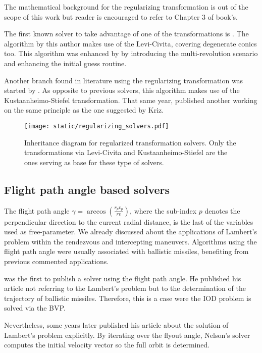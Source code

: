 The mathematical background for the regularizing transformation is out of the
scope of this work but reader is encouraged to refer to Chapter 3 of
\cite{celletti2002} book's.

The first known solver to take advantage of one of the transformations is
\cite{simo1973}. The algorithm by this author makes use of the Levi-Civita,
covering degenerate conics too. This algorithm was enhanced by \cite{torre2018}
by introducing the multi-revolution scenario and enhancing the initial guess routine.

Another branch found in literature using the regularizing transformation was
started by \cite{kriz1976}. As opposite to previous solvers, this algorithm
makes use of the Kustaanheimo-Stiefel transformation. That same year,
\cite{jezewski1976} published another working on the same principle as the one
suggested by Kriz.

\vspace{0.5cm}
\begin{figure}[h]
  \centering
  \texttt{[image: static/regularizing\_solvers.pdf]}
  \caption[Regularized transformation based solvers]{Inheritance diagram for regularized transformation solvers. Only the
    transformations via Levi-Civita and Kustaanheimo-Stiefel are the ones serving
    as base for these type of solvers.}
  \label{fig:regularizing_solvers}
\end{figure}


\subsection{Flight path angle based solvers}

The flight path angle $\gamma = \arccos{\left(\frac{r_p v_p}{r v} \right)}$,
where the sub-index $p$ denotes the perpendicular direction to the current radial
distance, is the last of the variables used as free-parameter. We already
discussed about the applications of Lambert's problem within the rendezvous and
intercepting maneuvers. Algorithms using the flight path angle were usually
associated with ballistic missiles, benefiting from previous commented
applications.

\cite{wheelon1959} was the first to publish a solver using the flight path
angle. He published his article not referring to the Lambert's problem but to
the determination of the trajectory of ballistic missiles. Therefore, this is a
case were the IOD problem is solved via the BVP.

Nevertheless, some years later \cite{nelson1992} published his article about the
solution of Lambert's problem explicitly. By iterating over the flyout angle,
Nelson's solver computes the initial velocity vector so the full orbit is
determined.

